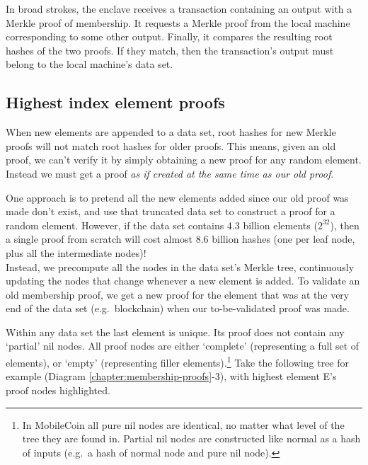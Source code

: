 In broad strokes, the enclave receives a transaction containing an output with a Merkle proof of membership. It requests a Merkle proof from the local machine corresponding to some other output. Finally, it compares the resulting root hashes of the two proofs. If they match, then the transaction's output must belong to the local machine's data set.


\subsection{Highest index element proofs}
\label{subsec:merkle-highest-index-proofs}

When new elements are appended to a data set, root hashes for new Merkle proofs will not match root hashes for older proofs. This means, given an old proof, we can't verify it by simply obtaining a new proof for any random element. Instead we must get a proof {\em as if created at the same time as our old proof}.

One approach is to pretend all the new elements added since our old proof was made don't exist, and use that truncated data set to construct a proof for a random element. However, if the data set contains 4.3 billion elements ($2^{32}$), then a single proof from scratch will cost almost 8.6 billion hashes (one per leaf node, plus all the intermediate nodes)!\\

Instead, we precompute all the nodes in the data set's Merkle tree, continuously updating the nodes that change whenever a new element is added. To validate an old membership proof, we get a new proof for the element that was at the very end of the data set (e.g.\ blockchain) when our to-be-validated proof was made.

Within any data set the last element is unique. Its proof does not contain any `partial' nil nodes. All proof nodes are either `complete' (representing a full set of elements), or `empty' (representing filler elements).\footnote{In MobileCoin all pure nil nodes are identical, no matter what level of the tree they are found in. Partial nil nodes are constructed like normal as a hash of inputs (e.g.\ a hash of normal node and pure nil node).} Take the following tree for example (Diagram \ref*{chapter:membership-proofs}-3), with highest element E's proof nodes highlighted.%

